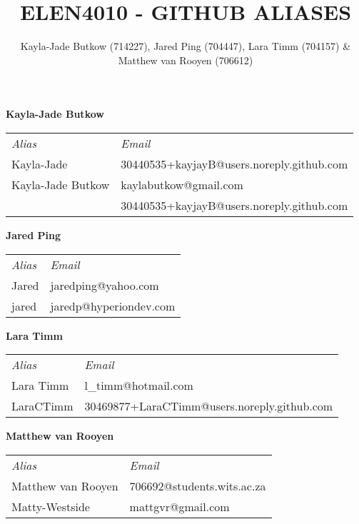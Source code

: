 \documentclass[10pt,onecolumn]{witseiepaper}
\title{ELEN4010 - GITHUB ALIASES}
\author{Kayla-Jade Butkow (714227), Jared Ping (704447), Lara Timm (704157) \& Matthew van Rooyen (706612)}
\begin{document}
\maketitle
\pagestyle{plain}
\setcounter{page}{1}


\textbf{Kayla-Jade Butkow}
~\\

\begin{tabular}{ll}
	\textit{Alias} & \textit{Email} \\[8pt]
	Kayla-Jade & 30440535+kayjayB@users.noreply.github.com \\[10pt] 
	Kayla-Jade Butkow & kaylabutkow@gmail.com \\[4pt]
	 & 30440535+kayjayB@users.noreply.github.com \\[10pt] 
\end{tabular} 

\vspace{3mm}

\textbf{Jared Ping}
~\\

\begin{tabular}{ll}
	\textit{Alias} & \textit{Email} \\[8pt]
	Jared & 
	jaredping@yahoo.com \\[10pt] 
	jared & jaredp@hyperiondev.com \\[10pt] 
\end{tabular} 

\vspace{5mm}

\textbf{Lara Timm}
~\\

\begin{tabular}{ll}
	\textit{Alias} & \textit{Email} \\[8pt]
	Lara Timm & 
	l\_timm@hotmail.com \\[10pt] 
	LaraCTimm & 30469877+LaraCTimm@users.noreply.github.com \\[10pt] 
\end{tabular} 

\vspace{5mm}

\textbf{Matthew van Rooyen}
~\\

\begin{tabular}{ll}
	\textit{Alias} & \textit{Email} \\[8pt]
	Matthew van Rooyen & 
	706692@students.wits.ac.za \\[10pt] 
	Matty-Westside & mattgvr@gmail.com \\[10pt] 
\end{tabular} 
\end{document}
